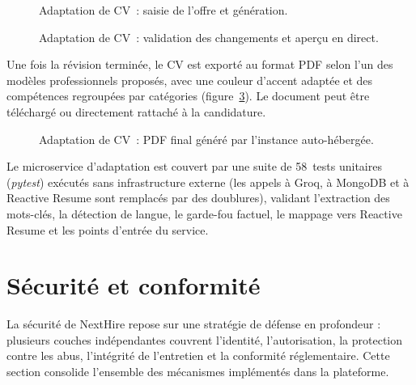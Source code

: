 \begin{figure}[H]
  \centering
  \caption{Adaptation de CV~: saisie de l'offre et génération.}
  \label{fig:cv-tailoring-form}
\end{figure}

\begin{figure}[H]
  \centering
  \caption{Adaptation de CV~: validation des changements et aperçu en direct.}
  \label{fig:cv-tailoring-review}
\end{figure}

Une fois la révision terminée, le CV est exporté au format PDF selon l'un des modèles professionnels proposés, avec une couleur d'accent adaptée et des compétences regroupées par catégories (figure~\ref{fig:cv-tailoring-pdf}). Le document peut être téléchargé ou directement rattaché à la candidature.

\begin{figure}[H]
  \centering
  \caption{Adaptation de CV~: PDF final généré par l'instance auto-hébergée.}
  \label{fig:cv-tailoring-pdf}
\end{figure}

Le microservice d'adaptation est couvert par une suite de 58~tests unitaires (\textit{pytest}) exécutés sans infrastructure externe (les appels à Groq, à MongoDB et à Reactive Resume sont remplacés par des doublures), validant l'extraction des mots-clés, la détection de langue, le garde-fou factuel, le mappage vers Reactive Resume et les points d'entrée du service.

\section{Sécurité et conformité}

La sécurité de NextHire repose sur une stratégie de défense en profondeur : plusieurs couches
indépendantes couvrent l'identité, l'autorisation, la protection contre les abus, l'intégrité
de l'entretien et la conformité réglementaire. Cette section consolide l'ensemble des mécanismes
implémentés dans la plateforme.

